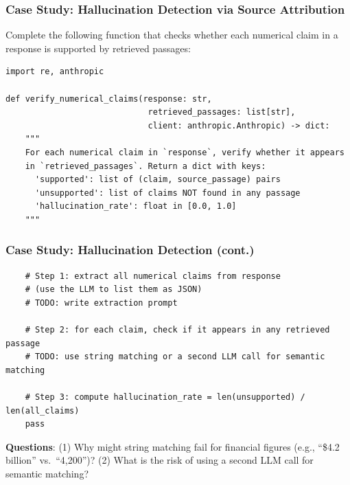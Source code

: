 \documentclass[9pt,t]{beamer}
\begin{document}
\begin{frame}[fragile]
\frametitle{Case Study: Hallucination Detection via Source Attribution}

Complete the following function that checks whether each numerical claim in a response is supported by retrieved passages:

\begin{lstlisting}
import re, anthropic

def verify_numerical_claims(response: str,
                             retrieved_passages: list[str],
                             client: anthropic.Anthropic) -> dict:
    """
    For each numerical claim in `response`, verify whether it appears
    in `retrieved_passages`. Return a dict with keys:
      'supported': list of (claim, source_passage) pairs
      'unsupported': list of claims NOT found in any passage
      'hallucination_rate': float in [0.0, 1.0]
    """
\end{lstlisting}
\end{frame}

\begin{frame}[fragile]
\frametitle{Case Study: Hallucination Detection (cont.)}

\begin{lstlisting}
    # Step 1: extract all numerical claims from response
    # (use the LLM to list them as JSON)
    # TODO: write extraction prompt

    # Step 2: for each claim, check if it appears in any retrieved passage
    # TODO: use string matching or a second LLM call for semantic matching

    # Step 3: compute hallucination_rate = len(unsupported) / len(all_claims)
    pass
\end{lstlisting}

\textbf{Questions}: (1) Why might string matching fail for financial figures (e.g., ``\$4.2 billion'' vs.\ ``4,200'')?
(2) What is the risk of using a second LLM call for semantic matching?
\end{frame}
\end{document}
